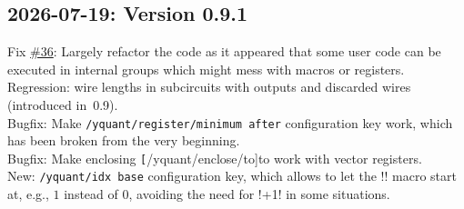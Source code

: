 \documentclass{scrartcl}
\def\ttlink{\link\texttt}
\begin{document}
      \subsection*{2026-07-19: Version 0.9.1}
         Fix \href{https://github.com/projekter/yquant/issues/36}{\#36}: Largely refactor the code as it appeared that some user code can be executed in internal groups which might mess with macros or registers. \\
         Regression: wire lengths in subcircuits with outputs and discarded wires (introduced in~0.9). \\
         Bugfix: Make \ttlink{/yquant/register/minimum after} configuration key work, which has been broken from the very beginning. \\
         Bugfix: Make enclosing \ttlink[/yquant/enclose/to]{to} work with vector registers. \\
         New: \ttlink{/yquant/idx base} configuration key, which allows to let the \tex!\idx! macro start at, e.g., $1$ instead of $0$, avoiding the need for \tex!\The\numexpr\idx+1\relax! in some situations.
\end{document}

